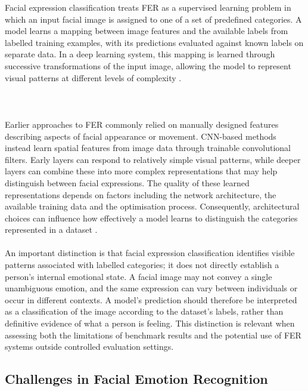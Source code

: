 \documentclass[12pt, a4paper]{report}
\let\oldsubsection\subsection
\renewcommand{\subsection}{%
    \Needspace{6\baselineskip}%
    \oldsubsection
}
\begin{document}
				Facial expression classification treats FER as a supervised learning problem in which an input facial image is assigned to one of a set of predefined categories. A model learns a mapping between image features and the available labels from labelled training examples, with its predictions evaluated against known labels on separate data. In a deep learning system, this mapping is learned through successive transformations of the input image, allowing the model to represent visual patterns at different levels of complexity \cite{Sutar2023DeepFER, Georgiou2026FERReview}.\\\\\\\\
				Earlier approaches to FER commonly relied on manually designed features describing aspects of facial appearance or movement. CNN-based methods instead learn spatial features from image data through trainable convolutional filters. Early layers can respond to relatively simple visual patterns, while deeper layers can combine these into more complex representations that may help distinguish between facial expressions. The quality of these learned representations depends on factors including the network architecture, the available training data and the optimisation process. Consequently, architectural choices can influence how effectively a model learns to distinguish the categories represented in a dataset \cite{Sutar2023DeepFER, Cai2021MIFADNet, Georgiou2026FERReview}.\\\\
				An important distinction is that facial expression classification identifies visible patterns associated with labelled categories; it does not directly establish a person's internal emotional state. A facial image may not convey a single unambiguous emotion, and the same expression can vary between individuals or occur in different contexts. A model's prediction should therefore be interpreted as a classification of the image according to the dataset's labels, rather than definitive evidence of what a person is feeling. This distinction is relevant when assessing both the limitations of benchmark results and the potential use of FER systems outside controlled evaluation settings.
				
			\subsection{Challenges in Facial Emotion Recognition}
				
\end{document}
